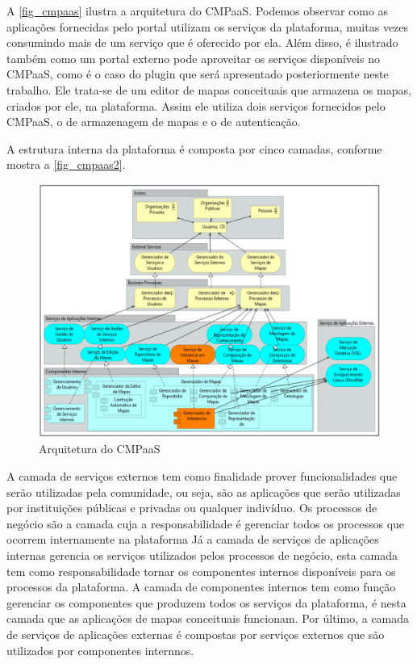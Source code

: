 \documentclass[
	12pt,				%
	openright,			%
	oneside,			%
	a4paper,			%
	english,			%
	french,				%
	spanish,			%
	brazil				%
	]{abntex2}
\begin{document}
A \autoref{fig_cmpaas} ilustra a arquitetura do CMPaaS. Podemos observar como as aplicações fornecidas pelo portal utilizam os serviços da plataforma, muitas vezes consumindo mais de um serviço que é oferecido por ela. Além disso, é ilustrado também como um portal externo pode aproveitar os serviços disponíveis no CMPaaS, como é o caso do plugin que será apresentado posteriormente neste trabalho. Ele trata-se de um editor de mapas conceituais que armazena os mapas, criados por ele, na plataforma. Assim ele utiliza dois serviços fornecidos pelo CMPaaS, o de armazenagem de mapas e o de autenticação. 

A estrutura interna da plataforma é composta por cinco camadas\cite{Perin2014}, conforme mostra a \autoref{fig_cmpaas2}.


\begin{figure}[htb]
	\caption{\label{fig_cmpaas2} Arquitetura do CMPaaS}
	\begin{center}
		\includegraphics[scale=0.3]{cmpaas2.png}
	\end{center}
\end{figure}

A camada de serviços externos tem como finalidade prover funcionalidades que serão utilizadas pela comunidade, ou seja, são as aplicações que serão utilizadas por instituições públicas e privadas ou qualquer indivíduo. Os processos de negócio são a camada cuja a responsabilidade é gerenciar todos os processos que ocorrem internamente na plataforma Já a camada de serviços de aplicações internas gerencia os serviços utilizados pelos processos de negócio, esta camada tem como responsabilidade tornar os componentes internos disponíveis para os processos da plataforma. A camada de componentes internos tem como função gerenciar os componentes que produzem todos os serviços da plataforma, é nesta camada que as aplicações de mapas conceituais funcionam. Por último, a camada de serviços de aplicações externas é compostas por serviços externos que são utilizados por componentes internnos\cite{Perin2014}.
\end{document}
